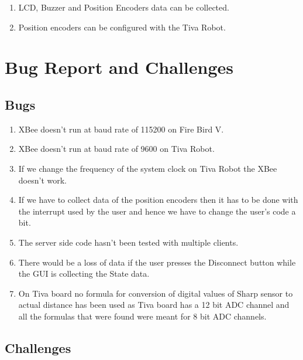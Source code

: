 \documentclass[a4paper,12pt,oneside]{book}
\begin{document}
\begin{enumerate}

\item LCD, Buzzer and Position Encoders data can be collected.
\item Position encoders can be configured with the Tiva Robot.

\end{enumerate}

\newpage

\section{Bug Report and Challenges}

\subsection{Bugs}


\begin{enumerate}

\item XBee doesn't run at baud rate of 115200 on Fire Bird V.
\item XBee doesn't run at baud rate of 9600 on Tiva Robot.
\item If we change the frequency of the system clock on Tiva Robot the XBee doesn't work.
\item If we have to collect data of the position encoders then it has to be done with the interrupt used by the user and hence we have to change the user's code a bit.
\item The server side code hasn't been tested with multiple clients.
\item There would be a loss of data if the user presses the Disconnect button while the GUI is collecting the State data.
\item On Tiva board no formula for conversion of digital values of Sharp sensor to actual distance has been used as Tiva board has a 12 bit ADC channel and all the formulas that were found were meant for 8 bit ADC channels.

\end{enumerate}

\subsection{Challenges}
\end{document}
